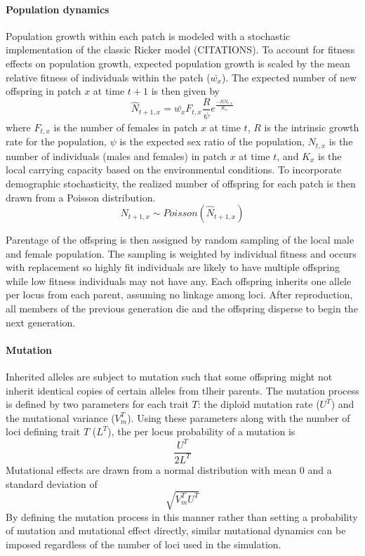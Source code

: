 \documentclass[11pt, oneside]{article}
\begin{document}
\paragraph{Population dynamics}
Population growth within each patch is modeled with a stochastic implementation of the classic Ricker model (CITATIONS). To account for fitness effects on population growth, expected population growth is scaled by the mean relative fitness of individuals within the patch ($\bar{w_{x}}$). The expected number of new offspring in patch $x$ at time $t+1$ is then given by
\begin{equation}
\hat{N}_{t+1,x}=\bar{w_{x}}F_{t,x}\frac{R}{\psi}e^{\frac{-RN_{t,x}}{K_{x}}}
\end{equation}
where $F_{t,x}$ is the number of females in patch $x$ at time $t$, $R$ is the intrinsic growth rate for the population, $\psi$ is the expected sex ratio of the population, $N_{t,x}$ is the number of individuals (males and females) in patch $x$ at time $t$, and $K_{x}$ is the local carrying capacity based on the environmental conditions. To incorporate demographic stochasticity, the realized number of offspring for each patch is then drawn from a Poisson distribution.
\begin{equation}
N_{t+1,x}\sim Poisson(\hat{N}_{t+1,x})
\end{equation}

Parentage of the offspring is then assigned by random sampling of the local male and female population. The sampling is weighted by individual fitness and occurs with replacement so highly fit individuals are likely to have multiple offspring while low fitness individuals may not have any. Each offspring inherits one allele per locus from each parent, assuming no linkage among loci. After reproduction, all members of the previous generation die and the offspring disperse to begin the next generation.

\paragraph{Mutation}
Inherited alleles are subject to mutation such that some offspring might not inherit identical copies of certain alleles from tlheir parents. The mutation process is defined by two parameters for each trait $T$: the diploid mutation rate ($U^{T}$) and the mutational variance ($V_{m}^{T}$). Using these parameters along with the number of loci defining trait $T$ ($L^{T}$), the per locus probability of a mutation is
\begin{equation}
\frac{U^{T}}{2L^{T}}
\end{equation}
Mutational effects are drawn from a normal distribution with mean $0$ and a standard deviation of
\begin{equation}
\sqrt{V_{m}^{T}U^{T}}
\end{equation}
By defining the mutation process in this manner rather than setting a probability of mutation and mutational effect directly, similar mutational dynamics can be imposed regardless of the number of loci used in the simulation.
\end{document}
